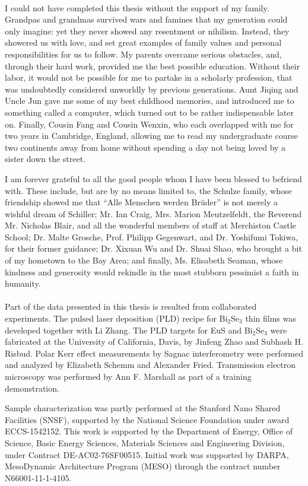 \paragraph{}
I could not have completed this thesis without the support of my family. Grandpas and grandmas survived wars and famines that my generation could only imagine: yet they never showed any resentment or nihilism. Instead, they showered us with love, and set great examples of family values and personal responsibilities for us to follow. My parents overcame serious obstacles, and, through their hard work, provided me the best possible education. Without their labor, it would not be possible for me to partake in a scholarly profession, that was undoubtedly considered unworldly by previous generations. Aunt Jiqing and Uncle Jun gave me some of my best childhood memories, and introduced me to something called a computer, which turned out to be rather indispensable later on. Finally, Cousin Fang and Cousin Wenxin, who each overlapped with me for two years in Cambridge, England, allowing me to read my undergraduate course two continents away from home without spending a day not being loved by a sister down the street.

I am forever grateful to all the good people whom I have been blessed to befriend with. These include, but are by no means limited to, the Schulze family, whose friendship showed me that ``Alle Menschen werden Br\"uder'' is not merely a wishful dream of Schiller; Mr. Ian Craig, Mrs. Marion Meutzelfeldt, the Reverend Mr. Nicholas Blair, and all the wonderful members of staff at Merchiston Castle School; Dr. Malte Grosche, Prof. Philipp Gegenwart, and Dr. Yoshifumi Tokiwa, for their former guidance; Dr. Xixuan Wu and Dr. Shuai Shao, who brought a bit of my hometown to the Bay Area; and finally, Ms. Elisabeth Seaman, whose kindness and generosity would rekindle in the most stubborn pessimist a faith in humanity.

\paragraph{}
Part of the data presented in this thesis is resulted from collaborated experiments. The pulsed laser deposition (PLD) recipe for Bi$_2$Se$_3$ thin films was developed together with Li Zhang. The PLD targets for EuS and Bi$_2$Se$_3$ were fabricated at the University of California, Davis, by Jinfeng Zhao and Subhash H. Risbud. Polar Kerr effect measurements by Sagnac interferometry were performed and analyzed by Elizabeth Schemm and Alexander Fried. Transmission electron microscopy was performed by Ann F. Marshall as part of a training demonstration.

Sample characterization was partly performed at the Stanford Nano Shared Facilities (SNSF), supported by the National Science Foundation under award ECCS-1542152.  This work is supported by the Department of Energy,  Office of Science, Basic Energy Sciences, Materials Sciences and Engineering Division, under Contract DE-AC02-76SF00515. Initial work was supported by DARPA, MesoDynamic Architecture Program (MESO) through the contract number N66001-11-1-4105.
